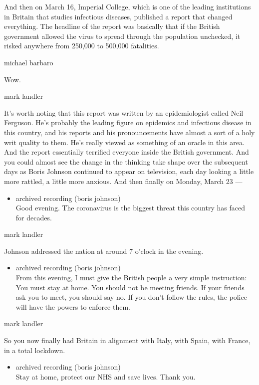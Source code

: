 And then on March 16, Imperial College, which is one of the leading
institutions in Britain that studies infectious diseases, published a
report that changed everything. The headline of the report was basically
that if the British government allowed the virus to spread through the
population unchecked, it risked anywhere from 250,000 to 500,000
fatalities.

michael barbaro

Wow.

mark landler

It's worth noting that this report was written by an epidemiologist
called Neil Ferguson. He's probably the leading figure on epidemics and
infectious disease in this country, and his reports and his
pronouncements have almost a sort of a holy writ quality to them. He's
really viewed as something of an oracle in this area. And the report
essentially terrified everyone inside the British government. And you
could almost see the change in the thinking take shape over the
subsequent days as Boris Johnson continued to appear on television, each
day looking a little more rattled, a little more anxious. And then
finally on Monday, March 23 ---

\begin{itemize}
\tightlist
\item
  archived recording (boris johnson)\\
  Good evening. The coronavirus is the biggest threat this country has
  faced for decades.
\end{itemize}

mark landler

Johnson addressed the nation at around 7 o'clock in the evening.

\begin{itemize}
\tightlist
\item
  archived recording (boris johnson)\\
  From this evening, I must give the British people a very simple
  instruction: You must stay at home. You should not be meeting friends.
  If your friends ask you to meet, you should say no. If you don't
  follow the rules, the police will have the powers to enforce them.
\end{itemize}

mark landler

So you now finally had Britain in alignment with Italy, with Spain, with
France, in a total lockdown.

\begin{itemize}
\tightlist
\item
  archived recording (boris johnson)\\
  Stay at home, protect our NHS and save lives. Thank you.
\end{itemize}

